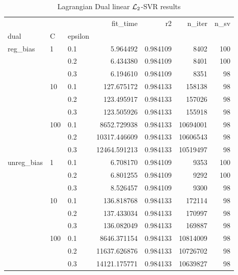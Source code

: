 \begin{table}[H]
\centering
\caption{Lagrangian Dual linear $\protect \mathcal{L}_2$-SVR results}
\label{linear_lagrangian_dual_l2_svr_cv_results}
\begin{tabular}{lllrrrr}
\toprule
           &     &     &      fit\_time &        r2 &    n\_iter &  n\_sv \\
dual & C & epsilon &               &           &           &       \\
\midrule
reg\_bias & 1   & 0.1 &      5.964492 &  0.984109 &      8402 &   100 \\
           &     & 0.2 &      6.434380 &  0.984109 &      8401 &   100 \\
           &     & 0.3 &      6.194610 &  0.984109 &      8351 &    98 \\
           & 10  & 0.1 &    127.675172 &  0.984133 &    158138 &    98 \\
           &     & 0.2 &    123.495917 &  0.984133 &    157026 &    98 \\
           &     & 0.3 &    123.505926 &  0.984133 &    155918 &    98 \\
           & 100 & 0.1 &   8652.729938 &  0.984133 &  10694001 &    98 \\
           &     & 0.2 &  10317.446609 &  0.984133 &  10606543 &    98 \\
           &     & 0.3 &  12464.591213 &  0.984133 &  10519497 &    98 \\
unreg\_bias & 1   & 0.1 &      6.708170 &  0.984109 &      9353 &   100 \\
           &     & 0.2 &      6.801255 &  0.984109 &      9292 &   100 \\
           &     & 0.3 &      8.526457 &  0.984109 &      9300 &    98 \\
           & 10  & 0.1 &    136.818768 &  0.984133 &    172114 &    98 \\
           &     & 0.2 &    137.433034 &  0.984133 &    170997 &    98 \\
           &     & 0.3 &    136.082049 &  0.984133 &    169887 &    98 \\
           & 100 & 0.1 &   8646.371154 &  0.984133 &  10814009 &    98 \\
           &     & 0.2 &  11637.626876 &  0.984133 &  10726702 &    98 \\
           &     & 0.3 &  14121.175771 &  0.984133 &  10639827 &    98 \\
\bottomrule
\end{tabular}
\end{table}
